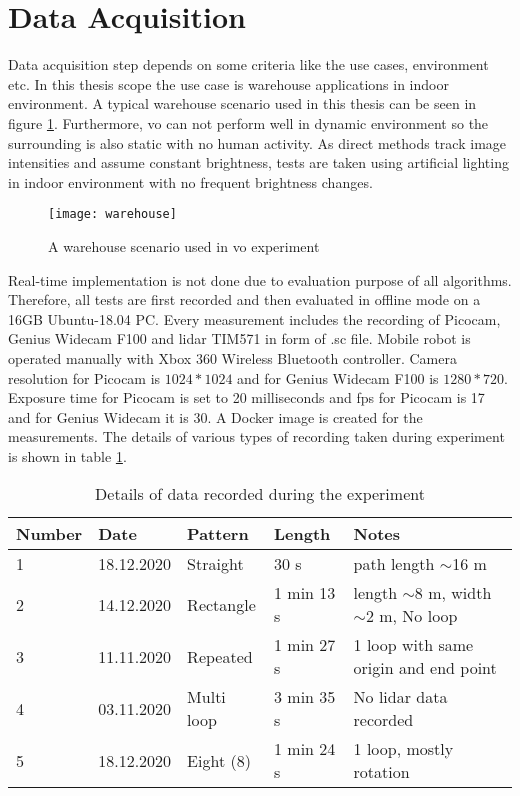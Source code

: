 \section{Data Acquisition}
Data acquisition step depends on some criteria like the use cases, environment etc. In this thesis scope the use case is warehouse applications in indoor environment. A typical warehouse scenario used in this thesis can be seen in figure \ref{fig:warehouse}. Furthermore, \acrshort{vo} can not perform well in dynamic environment so the surrounding is also static with no human activity. As direct methods track image intensities and assume constant brightness, tests are taken using artificial lighting in indoor environment with no frequent brightness changes.
\begin{figure}[H]
	\centering
	\texttt{[image: warehouse]}
	\caption{A warehouse scenario used in \acrshort{vo} experiment}
	\label{fig:warehouse}
\end{figure}
\noindent Real-time implementation is not done due to evaluation purpose of all algorithms. Therefore, all tests are first recorded and then evaluated in offline mode on a 16GB Ubuntu-18.04 PC. Every measurement includes the recording of Picocam, Genius Widecam F100 and \acrshort{lidar} TIM571 in form of .sc file. Mobile robot is operated manually with Xbox 360 Wireless Bluetooth controller. Camera resolution for Picocam is $ 1024 * 1024 $ and for Genius Widecam F100 is $ 1280 * 720 $. Exposure time for Picocam is set to 20 milliseconds and \acrshort{fps} for Picocam is 17 and for Genius Widecam it is 30. A Docker image is created for the measurements. The details of various types of recording taken during experiment is shown in table \ref{table:recording}.
\begin{table}[H]
	\centering
	\renewcommand{\arraystretch}{1.5}
	\begin{tabular}{ l l  l  l  p{5cm} }
		
		\textbf{Number} & \textbf{Date} & \textbf{Pattern}  & \textbf{Length}  & \textbf{Notes}  \\    
		\hline
		1 & 18.12.2020 &  Straight  & 30 s & path length $\sim$16 m  \\ 
		\hline
		2 & 14.12.2020  & Rectangle & 1 min 13 s   & length $\sim$8 m, width $\sim$2 m, No loop\\ 
		\hline
		3 & 11.11.2020  & Repeated  & 1 min 27 s  & 1 loop with same origin and end point\\ 
		\hline
		4 & 03.11.2020   & Multi loop  &  3 min 35 s  & No \acrshort{lidar} data recorded \\
		\hline
		5 & 18.12.2020 & Eight (8) & 1 min 24 s &  1 loop, mostly rotation  \\
		\hline
	\end{tabular}
	\caption{Details of data recorded during the experiment}
	\label{table:recording}
\end{table}

